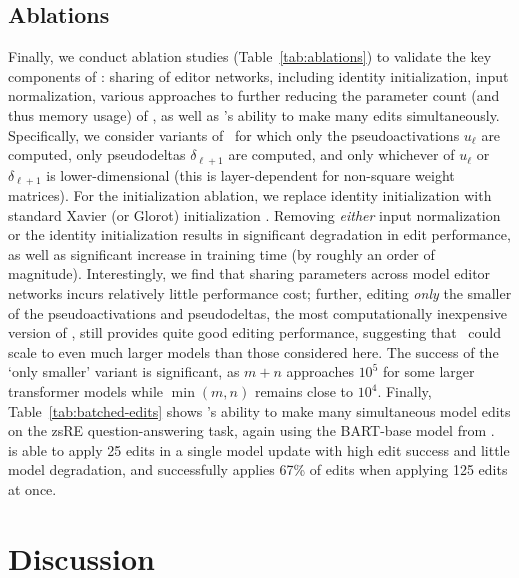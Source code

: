 \documentclass{article}
\begin{document}


\subsection{Ablations}
\label{sec:ablations}



Finally, we conduct ablation studies (Table~\ref{tab:ablations}) to validate the key components of \name: sharing of editor networks, including identity initialization, input normalization, various approaches to further reducing the parameter count (and thus memory usage) of \name, as well as \name's ability to make many edits simultaneously. Specifically, we consider variants of \name~for which only the pseudoactivations $u_\ell$ are computed, only pseudodeltas $\delta_{\ell+1}$ are computed, and only whichever of $u_\ell$ or $\delta_{\ell+1}$ is lower-dimensional (this is layer-dependent for non-square weight matrices). For the initialization ablation, we replace identity initialization with standard Xavier (or Glorot) initialization \citep{pmlr-v9-glorot10a}.  Removing \textit{either} input normalization or the identity initialization results in significant degradation in edit performance, as well as significant increase in training time (by roughly an order of magnitude). Interestingly, we find that sharing parameters across model editor networks incurs relatively little performance cost; further, editing \textit{only} the smaller of the pseudoactivations and pseudodeltas, the most computationally inexpensive version of \name, still provides quite good editing performance, suggesting that \name~could scale to even much larger models than those considered here. The success of the `only smaller' variant is significant, as $m+n$ approaches $10^5$ for some larger transformer models \citep{brown2020language} while $\min(m,n)$ remains close to $10^4$. Finally, Table~\ref{tab:batched-edits} shows \name's ability to make many simultaneous model edits on the zsRE question-answering task, again using the BART-base model from \cite{Cao2021EditingFK}. \name~ is able to apply 25 edits in a single model update with high edit success and little model degradation, and successfully applies 67\% of edits when applying 125 edits at once.


\section{Discussion}
\end{document}
